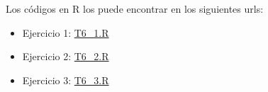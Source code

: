 \documentclass[12pt]{article}
\begin{document}

 \pagebreak
 \pagebreak
 \pagebreak

Los códigos en R los puede encontrar en los siguientes urls:

\begin{itemize}
    \item Ejercicio 1: \href{https://github.com/Hamgalex/MetodosEstadisticosMultivariados/blob/main/T6/T6_1.R}{T6\_1.R}
    \item Ejercicio 2: \href{https://github.com/Hamgalex/MetodosEstadisticosMultivariados/blob/main/T6/T6_2.R}{T6\_2.R}
    \item Ejercicio 3: \href{https://github.com/Hamgalex/MetodosEstadisticosMultivariados/blob/main/T6/T6_3.R}{T6\_3.R}
\end{itemize}



\end{document}
